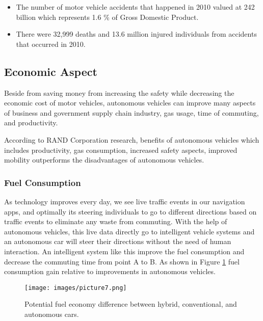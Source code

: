 \documentclass[sigconf]{acmart}
\begin{document}
\begin{itemize}

\item The number of motor vehicle accidents that happened in 2010 valued at 242 billion which represents 1.6 \% of Gross Domestic Product\cite{lawrance}.

\item There were 32,999 deaths and 13.6 million injured individuals from accidents that occurred in 2010\cite{lawrance}.

\end{itemize}


\subsection{Economic Aspect}
Beside from saving money from increasing the safety while decreasing the economic cost of motor vehicles, autonomous vehicles can improve many aspects of business and government supply chain industry, gas usage, time of commuting, and productivity.

\par According to RAND Corporation research, benefits of aut\-ono\-mous vehicles which includes productivity, gas consumption, increased safety aspects, improved mobility outperforms the disadvantages of autonomous vehicles\cite{RAND}.

\subsubsection{Fuel Consumption}As technology improves every day, we see live traffic events in our navigation apps, and optimally its steering individuals to go to different directions based on traffic events to eliminate any waste from commuting\cite{toronto}. With the help of autonomous vehicles, this live data directly go to intelligent vehicle systems and an autonomous car will steer their directions without the need of human interaction. An intelligent system like this improve the fuel consumption and decrease the commuting time from point A to B\cite{toronto}. As shown in Figure \ref{fig:fuelconsumption} fuel consumption gain relative to improvements in autonomous vehicles\cite{toronto}.

\begin{figure}[!ht]
  \centering
      \texttt{[image: images/picture7.png]}
  \caption{Potential fuel economy difference between hybrid, conventional, and autonomous cars.}\label{fig:fuelconsumption}
\end{figure}
\end{document}
